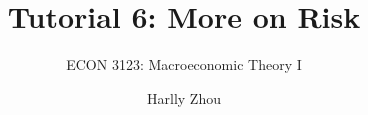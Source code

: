 \documentclass[xcolor=dvipsnames]{beamer}
\title[Measurment of Macroeconomy]{Tutorial 6: More on Risk}
\subtitle{ECON 3123: Macroeconomic Theory I}
\author[Harlly Zhou]{Harlly Zhou}
\institute[HKUST]{Department of Economics\\
HKUST Business School}
\date{}
\begin{document}
\begin{frame}
\titlepage
\end{frame}
\end{document}
